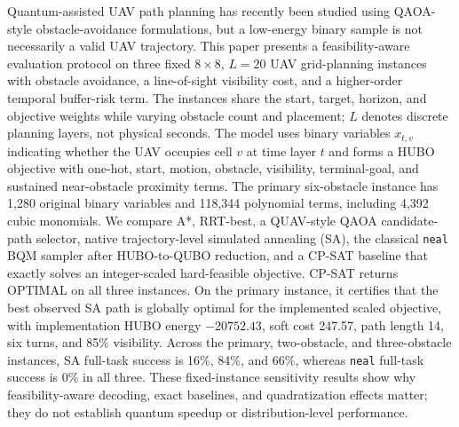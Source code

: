 Quantum-assisted UAV path planning has recently been studied using QAOA-style obstacle-avoidance formulations, but a low-energy binary sample is not necessarily a valid UAV trajectory. This paper presents a feasibility-aware evaluation protocol on three fixed $8\times8$, $L=20$ UAV grid-planning instances with obstacle avoidance, a line-of-sight visibility cost, and a higher-order temporal buffer-risk term. The instances share the start, target, horizon, and objective weights while varying obstacle count and placement; $L$ denotes discrete planning layers, not physical seconds. The model uses binary variables $x_{t,v}$ indicating whether the UAV occupies cell $v$ at time layer $t$ and forms a HUBO objective with one-hot, start, motion, obstacle, visibility, terminal-goal, and sustained near-obstacle proximity terms. The primary six-obstacle instance has 1,280 original binary variables and 118,344 polynomial terms, including 4,392 cubic monomials. We compare A*, RRT-best, a QUAV-style QAOA candidate-path selector, native trajectory-level simulated annealing (SA), the classical \texttt{neal} BQM sampler after HUBO-to-QUBO reduction, and a CP-SAT baseline that exactly solves an integer-scaled hard-feasible objective. CP-SAT returns OPTIMAL on all three instances. On the primary instance, it certifies that the best observed SA path is globally optimal for the implemented scaled objective, with implementation HUBO energy $-20752.43$, soft cost 247.57, path length 14, six turns, and 85\% visibility. Across the primary, two-obstacle, and three-obstacle instances, SA full-task success is 16\%, 84\%, and 66\%, whereas \texttt{neal} full-task success is 0\% in all three. These fixed-instance sensitivity results show why feasibility-aware decoding, exact baselines, and quadratization effects matter; they do not establish quantum speedup or distribution-level performance.
